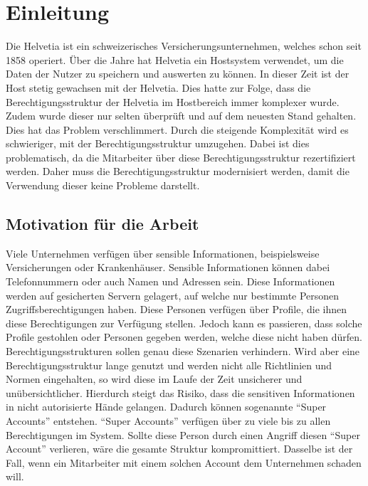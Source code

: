 \chapter{Einleitung}
\label{ch:intro}
Die Helvetia ist ein schweizerisches Versicherungsunternehmen, welches schon seit 1858 operiert. \cite{Helv}
Über die Jahre hat Helvetia ein Hostsystem verwendet, um die Daten der Nutzer zu speichern und auswerten zu können.
In dieser Zeit ist der Host stetig gewachsen mit der Helvetia.
Dies hatte zur Folge, dass die Berechtigungsstruktur der Helvetia im Hostbereich immer komplexer wurde.
Zudem wurde dieser nur selten überprüft und auf dem neuesten Stand gehalten.
Dies hat das Problem verschlimmert.
Durch die steigende Komplexität wird es schwieriger, mit der Berechtigungsstruktur umzugehen.
Dabei ist dies problematisch, da die Mitarbeiter über diese Berechtigungsstruktur rezertifiziert werden.
Daher muss die Berechtigungsstruktur modernisiert werden, damit die Verwendung dieser keine Probleme darstellt.

\section{Motivation für die Arbeit}
\label{sec:intro:motivation}
Viele Unternehmen verfügen über sensible Informationen, beispielsweise Versicherungen oder Krankenhäuser.
Sensible Informationen können dabei Telefonnummern oder auch Namen und Adressen sein.
Diese Informationen werden auf gesicherten Servern gelagert, auf welche nur bestimmte Personen Zugriffsberechtigungen haben.
Diese Personen verfügen über Profile, die ihnen diese Berechtigungen zur Verfügung stellen.
Jedoch kann es passieren, dass solche Profile gestohlen oder Personen gegeben werden, welche diese nicht haben dürfen.
Berechtigungsstrukturen sollen genau diese Szenarien verhindern.
Wird aber eine Berechtigungsstruktur lange genutzt und werden nicht alle Richtlinien und Normen eingehalten, so wird diese im Laufe der Zeit unsicherer und unübersichtlicher.
Hierdurch steigt das Risiko, dass die sensitiven Informationen in nicht autorisierte Hände gelangen.
Dadurch können sogenannte "`Super Accounts"' entstehen.
"`Super Accounts"' verfügen über zu viele bis zu allen Berechtigungen im System.
Sollte diese Person durch einen Angriff diesen "`Super Account"' verlieren, wäre die gesamte Struktur kompromittiert.
Dasselbe ist der Fall, wenn ein Mitarbeiter mit einem solchen Account dem Unternehmen schaden will.

